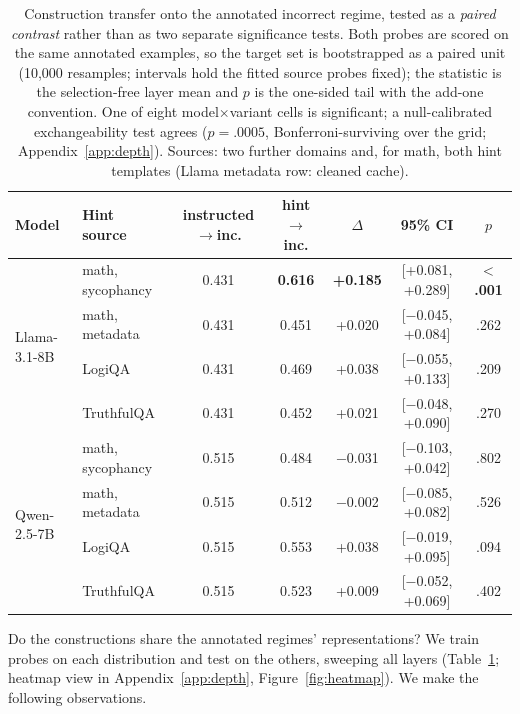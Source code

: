 \documentclass[11pt]{article}
\begin{document}
\begin{table}[t]
\centering
\small
\setlength{\tabcolsep}{5pt}
\begin{tabular}{@{}llccccc@{}}
\toprule
\textbf{Model} & \textbf{Hint source} & \textbf{instructed$\to$inc.} & \textbf{hint$\to$inc.} & \textbf{$\Delta$} & \textbf{95\% CI} & \textbf{$p$} \\
\midrule
\multirow{4}{*}{Llama-3.1-8B} & math, sycophancy & 0.431 & \textbf{0.616} & \textbf{+0.185} & [+0.081, +0.289] & \textbf{$<$.001} \\
 & math, metadata  & 0.431 & 0.451 & +0.020 & [$-$0.045, +0.084] & .262 \\
 & LogiQA          & 0.431 & 0.469 & +0.038 & [$-$0.055, +0.133] & .209 \\
 & TruthfulQA      & 0.431 & 0.452 & +0.021 & [$-$0.048, +0.090] & .270 \\
\midrule
\multirow{4}{*}{Qwen-2.5-7B} & math, sycophancy & 0.515 & 0.484 & $-$0.031 & [$-$0.103, +0.042] & .802 \\
 & math, metadata  & 0.515 & 0.512 & $-$0.002 & [$-$0.085, +0.082] & .526 \\
 & LogiQA          & 0.515 & 0.553 & +0.038 & [$-$0.019, +0.095] & .094 \\
 & TruthfulQA      & 0.515 & 0.523 & +0.009 & [$-$0.052, +0.069] & .402 \\
\bottomrule
\end{tabular}
\caption{Construction transfer onto the annotated incorrect regime, tested as a \emph{paired contrast} rather than as two separate significance tests. Both probes are scored on the same annotated examples, so the target set is bootstrapped as a paired unit (10{,}000 resamples; intervals hold the fitted source probes fixed); the statistic is the selection-free layer mean and $p$ is the one-sided tail with the add-one convention. One of eight model$\times$variant cells is significant; a null-calibrated exchangeability test agrees ($p{=}.0005$, Bonferroni-surviving over the grid; Appendix~\ref{app:depth}). Sources: two further domains and, for math, both hint templates (Llama metadata row: cleaned cache).}
\label{tab:bridge}
\end{table}

Do the constructions share the annotated regimes' representations? We train probes on each distribution and test on the others, sweeping all layers (Table~\ref{tab:bridge}; heatmap view in Appendix~\ref{app:depth}, Figure~\ref{fig:heatmap}). We make the following observations.
\end{document}

